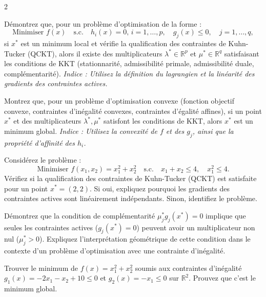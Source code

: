 \begin{multicols}{2}

\begin{exercice}
	Démontrez que, pour un problème d'optimisation de la forme :
	\[
	\text{Minimiser } f(x) \quad \text{s.c.} \quad h_i(x) = 0, \, i=1,\dots,p, \quad g_j(x) \leq 0, \quad j=1,\dots,q,
	\]
	si \( x^* \) est un minimum local et vérifie la qualification des contraintes de Kuhn-Tucker (QCKT), alors il existe des multiplicateurs \( \lambda^* \in \mathbb{R}^p \) et \( \mu^* \in \mathbb{R}^q \) satisfaisant les conditions de KKT (stationnarité, admissibilité primale, admissibilité duale, complémentarité). \textit{Indice : Utilisez la définition du lagrangien et la linéarité des gradients des contraintes actives.}
\end{exercice}

\begin{exercice}
	Montrez que, pour un problème d'optimisation convexe (fonction objectif convexe, contraintes d'inégalité convexes, contraintes d'égalité affines), si un point \( x^* \) et des multiplicateurs \( \lambda^*, \mu^* \) satisfont les conditions de KKT, alors \( x^* \) est un minimum global. \textit{Indice : Utilisez la convexité de \( f \) et des \( g_j \), ainsi que la propriété d'affinité des \( h_i \).}
\end{exercice}

\begin{exercice}
	Considérez le problème :
	\[
	\text{Minimiser } f(x_1, x_2) = x_1^2 + x_2^2 \quad \text{s.c.} \quad x_1 + x_2 \leq 4, \quad x_1^2 \leq 4.
	\]
	Vérifiez si la qualification des contraintes de Kuhn-Tucker (QCKT) est satisfaite pour un point \( x^* = (2, 2) \). Si oui, expliquez pourquoi les gradients des contraintes actives sont linéairement indépendants. Sinon, identifiez le problème.
\end{exercice}

\begin{exercice}
	Démontrez que la condition de complémentarité \( \mu_j^* g_j(x^*) = 0 \) implique que seules les contraintes actives (\( g_j(x^*) = 0 \)) peuvent avoir un multiplicateur non nul (\( \mu_j^* > 0 \)). Expliquez l'interprétation géométrique de cette condition dans le contexte d'un problème d'optimisation avec une contrainte d'inégalité.
\end{exercice}

\begin{exercice}
	Trouver le minimum de $f(x) = x_{1}^{2} + x_{2}^{2}$ soumis aux contraintes d'inégalité $g_{1}(x) = -2x_{1} - x_{2} + 10 \leqslant 0$ et $g_{2}(x) = -x_{1} \leqslant 0$ sur $\mathbb{R}^{2}$. Prouvez que c'est le minimum global.
\end{exercice}


\end{multicols}
